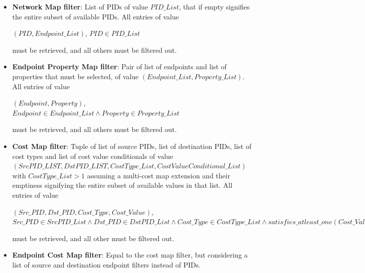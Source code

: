     \begin{itemize}
        \item \textbf{Network Map filter}: List of PIDs of value $PID\_List$, that if empty signifies the entire subset of available PIDs.
            All entries of value

            \begin{center}
            $(PID, Endpoint\_List)$, $PID \in PID\_List$
            \end{center}

            must be retrieved, and all others must be filtered out.

        \item \textbf{Endpoint Property Map filter}: Pair of list of endpoints and list of properties that must be selected, of value $(Endpoint\_List, Property\_List)$.
            All entries of value

            \begin{center}
            $(Endpoint, Property)$, $Endpoint \in Endpoint\_List \land Property \in Property\_List$
            \end{center}

            must be retrieved, and all others must be filtered out.

        \item \textbf{Cost Map filter}: Tuple of list of source PIDs, list of destination PIDs, list of cost types and list of cost value conditionals of value $(SrcPID\_LIST, DstPID\_LIST, CostType\_List, CostValueConditional\_List)$ with $CostType\_List > 1$ assuming a multi-cost map extension and their emptiness signifying the entire subset of available values in that list.
            All entries of value

            \begin{center}
            $(Src\_PID, Dst\_PID, Cost\_Type, Cost\_Value)$, $Src\_PID \in SrcPID\_List \land Dst\_PID \in DstPID\_List \land Cost\_Type \in CostType\_List \land satisfies\_atleast\_one(Cost\_Value, CostValueConditional\_List)$
            \end{center}

             must be retrieved, and all other must be filtered out.

        \item \textbf{Endpoint Cost Map filter}: Equal to the cost map filter, but considering a list of source and destination endpoint filters instead of PIDs.
    \end{itemize}

